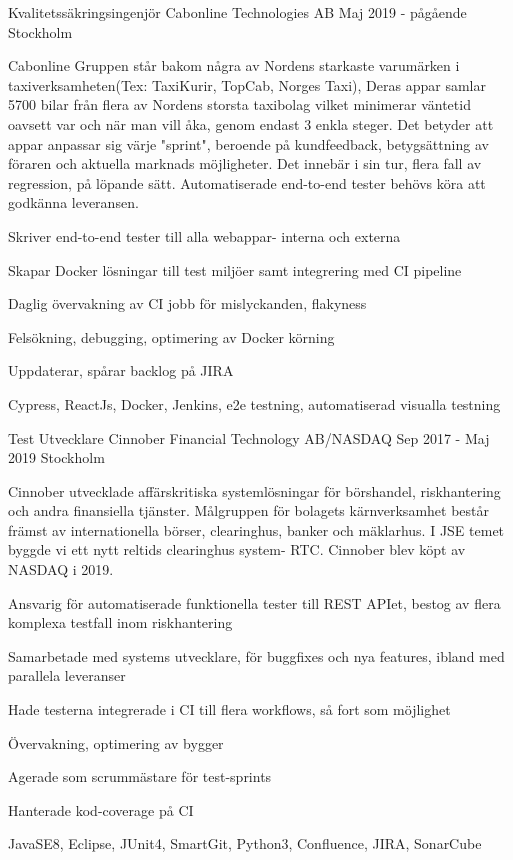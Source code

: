 \documentclass[12pt, a4paper]{awesome-cv}
\begin{document}
  \begin{cventries}
    \cventry
      {Kvalitetssäkringsingenjör}
      {Cabonline Technologies AB}
      {Maj 2019 - pågående}
      {Stockholm}
      {
        \justify
        Cabonline Gruppen står bakom några av Nordens starkaste varumärken i taxiverksamheten(Tex: TaxiKurir, TopCab, Norges Taxi),
        Deras appar samlar 5700 bilar från flera av Nordens storsta taxibolag vilket minimerar väntetid oavsett var och när man vill åka,
        genom endast 3 enkla steger. Det betyder att appar anpassar sig värje "sprint", beroende på kundfeedback, betygsättning av föraren
        och aktuella marknads möjligheter. Det innebär i sin tur, flera fall av regression, på löpande sätt. Automatiserade end-to-end tester behövs
        köra att godkänna leveransen.
        \hfill \break
        \hfill \break
        \begin{cvitems}
          \item Skriver end-to-end tester till alla webappar- interna och externa
          \item Skapar Docker lösningar till test miljöer samt integrering med CI pipeline
          \item Daglig övervakning av CI jobb för mislyckanden, flakyness
          \item Felsökning, debugging, optimering av Docker körning
          \item Uppdaterar, spårar backlog på JIRA
          \item Cypress, ReactJs, Docker, Jenkins, e2e testning, automatiserad visualla testning
        \end{cvitems}
      }

    \cventry
      {Test Utvecklare}
      {Cinnober Financial Technology AB/NASDAQ}
      {Sep 2017 - Maj 2019}
      {Stockholm}
      {
        \justify
        Cinnober utvecklade affärskritiska systemlösningar för börshandel, riskhantering och andra
        finansiella tjänster. Målgruppen för bolagets kärnverksamhet består främst av internationella börser,
        clearinghus, banker och mäklarhus. I JSE temet
        byggde vi ett nytt reltids clearinghus system- RTC. Cinnober blev köpt av NASDAQ i 2019.
        \hfill \break
        \hfill \break
        \begin{cvitems}
          \item Ansvarig för automatiserade funktionella tester till REST APIet, bestog av flera komplexa testfall inom riskhantering
          \item Samarbetade med systems utvecklare, för buggfixes och nya features, ibland med parallela leveranser
          \item Hade testerna integrerade i CI till flera workflows, så fort som möjlighet
          \item Övervakning, optimering av bygger
          \item Agerade som scrummästare för test-sprints
          \item Hanterade kod-coverage på CI
          \item JavaSE8, Eclipse, JUnit4, SmartGit, Python3, Confluence, JIRA, SonarCube
        \end{cvitems}
      }


\end{cventries}
\end{document}

